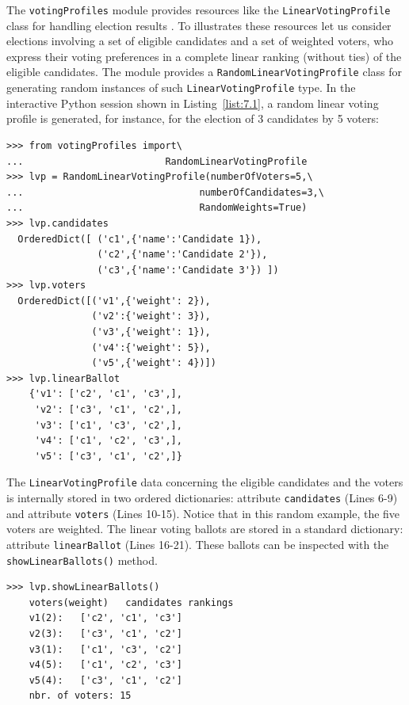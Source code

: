 The \texttt{votingProfiles} module provides resources like the \texttt{LinearVoting\-Profile} class for handling election results \citep{ADT-L2}. To illustrates these resources let us consider elections involving a set of eligible candidates and a set of weighted voters, who express their voting preferences in a complete linear ranking (without ties) of the eligible candidates. The module provides a \texttt{RandomLinear\-VotingProfile} class  for generating random instances of such \texttt{LinearVot\-ingProfile} type. In the interactive Python session shown in Listing~\vref{list:7.1}, a random linear voting profile is generated, for instance, for the election of 3 candidates by 5 voters:
\begin{lstlisting}[caption={Example of random linear voting profile},label=list:7.1]
>>> from votingProfiles import\
...                         RandomLinearVotingProfile
>>> lvp = RandomLinearVotingProfile(numberOfVoters=5,\
...                               numberOfCandidates=3,\
...                               RandomWeights=True) 
>>> lvp.candidates
  OrderedDict([ ('c1',{'name':'Candidate 1}),
                ('c2',{'name':'Candidate 2'}),
                ('c3',{'name':'Candidate 3'}) ])
>>> lvp.voters
  OrderedDict([('v1',{'weight': 2}),
               ('v2':{'weight': 3}), 
               ('v3',{'weight': 1}),
               ('v4':{'weight': 5}),
               ('v5',{'weight': 4})])
>>> lvp.linearBallot
    {'v1': ['c2', 'c1', 'c3',],
     'v2': ['c3', 'c1', 'c2',],
     'v3': ['c1', 'c3', 'c2',],
     'v4': ['c1', 'c2', 'c3',],
     'v5': ['c3', 'c1', 'c2',]} 
 \end{lstlisting}

The \texttt{LinearVotingProfile} data concerning the eligible candidates and the voters is internally stored in two ordered dictionaries: attribute \texttt{candidates} (Lines 6-9) and attribute \texttt{voters} (Lines 10-15). Notice that in this random example, the five voters are weighted. The linear voting ballots are stored in a standard dictionary: attribute \texttt{linearBallot} (Lines 16-21). These ballots can be inspected with the \texttt{showLinearBallots()} method.
\begin{lstlisting}[caption={Showing linear voting profiles},label=list:7.2]
>>> lvp.showLinearBallots()
    voters(weight)	 candidates rankings
    v1(2): 	 ['c2', 'c1', 'c3']
    v2(3): 	 ['c3', 'c1', 'c2']
    v3(1): 	 ['c1', 'c3', 'c2']
    v4(5): 	 ['c1', 'c2', 'c3']
    v5(4): 	 ['c3', 'c1', 'c2']
    nbr. of voters: 15
\end{lstlisting}

